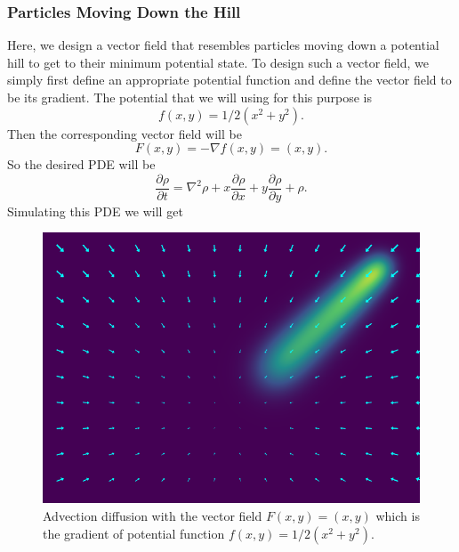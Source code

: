 \subsubsection{Particles Moving Down the Hill}
Here, we design a vector field that resembles particles moving down a potential hill to get to their minimum potential state. To design such a vector field, we simply first define an appropriate potential function and define the vector field to be its gradient. The potential that we will using for this purpose is 
\[ f(x,y) = 1/2(x^2 + y^2). \]
Then the corresponding vector field will be
\[ F(x,y) = -\nabla f(x,y) = (x,y). \]
So the desired PDE will be
\[ \frac{\partial \rho}{\partial t} = \nabla^2 \rho + x \frac{\partial \rho}{\partial x} + y \frac{\partial \rho}{\partial y} + \rho. \] 
Simulating this PDE we will get
\begin{figure}[h!]
	\centering
	\includegraphics[width=0.7\linewidth]{images/movingToCenter.png}
	\caption{Advection diffusion with the vector field $ F(x,y) = (x,y)$ which is the gradient of potential function $ f(x,y) = 1/2(x^2 + y^2) $.}
	\label{fig:potentialAsGradient}
\end{figure}


